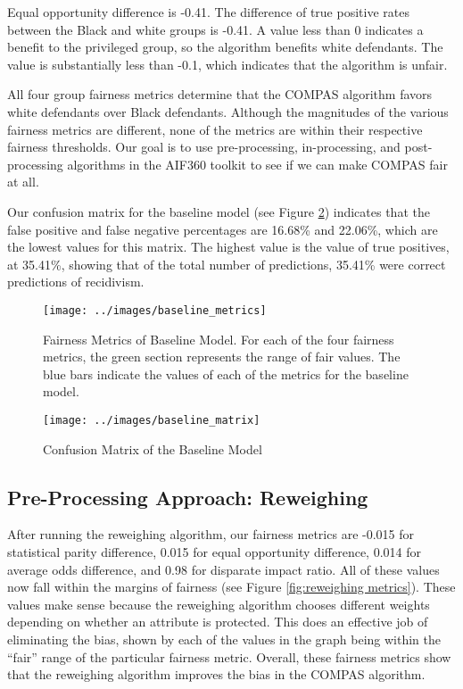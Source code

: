 \documentclass[,article,,moreauthors,pdftex]{mdpi}
\begin{document}
Equal opportunity difference is -0.41. The difference of true positive
rates between the Black and white groups is -0.41. A value less than 0
indicates a benefit to the privileged group, so the algorithm benefits
white defendants. The value is substantially less than -0.1, which
indicates that the algorithm is unfair.

All four group fairness metrics determine that the COMPAS algorithm
favors white defendants over Black defendants. Although the magnitudes
of the various fairness metrics are different, none of the metrics are
within their respective fairness thresholds. Our goal is to use
pre-processing, in-processing, and post-processing algorithms in the
AIF360 toolkit to see if we can make COMPAS fair at all.

Our confusion matrix for the baseline model (see Figure
\ref{fig:baseline matrix}) indicates that the false positive and false
negative percentages are 16.68\% and 22.06\%, which are the lowest
values for this matrix. The highest value is the value of true
positives, at 35.41\%, showing that of the total number of predictions,
35.41\% were correct predictions of recidivism.

\begin{figure}

{\centering \texttt{[image: ../images/baseline\_metrics]} 

}

\caption{Fairness Metrics of Baseline Model. For each of the four fairness metrics, the green section represents the range of fair values. The blue bars indicate the values of each of the metrics for the baseline model.}\label{fig:baseline metrics}
\end{figure}

\begin{figure}

{\centering \texttt{[image: ../images/baseline\_matrix]} 

}

\caption{Confusion Matrix of the Baseline Model}\label{fig:baseline matrix}
\end{figure}

\hypertarget{pre-processing-approach-reweighing}{%
\subsection{Pre-Processing Approach:
Reweighing}\label{pre-processing-approach-reweighing}}

After running the reweighing algorithm, our fairness metrics are -0.015
for statistical parity difference, 0.015 for equal opportunity
difference, 0.014 for average odds difference, and 0.98 for disparate
impact ratio. All of these values now fall within the margins of
fairness (see Figure \ref{fig:reweighing metrics}). These values make
sense because the reweighing algorithm chooses different weights
depending on whether an attribute is protected. This does an effective
job of eliminating the bias, shown by each of the values in the graph
being within the ``fair'' range of the particular fairness metric.
Overall, these fairness metrics show that the reweighing algorithm
improves the bias in the COMPAS algorithm.
\end{document}
